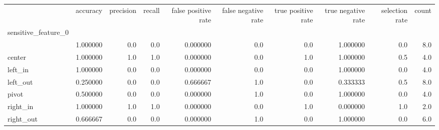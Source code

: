 \begin{tabular}{lrrrrrrrrr}
\toprule
{} &  accuracy &  precision &  recall &  false positive rate &  false negative rate &  true positive rate &  true negative rate &  selection rate &  count \\
sensitive\_feature\_0 &           &            &         &                      &                      &                     &                     &                 &        \\
\midrule
                    &  1.000000 &        0.0 &     0.0 &             0.000000 &                  0.0 &                 0.0 &            1.000000 &             0.0 &    8.0 \\
center              &  1.000000 &        1.0 &     1.0 &             0.000000 &                  0.0 &                 1.0 &            1.000000 &             0.5 &    4.0 \\
left\_in             &  1.000000 &        0.0 &     0.0 &             0.000000 &                  0.0 &                 0.0 &            1.000000 &             0.0 &    4.0 \\
left\_out            &  0.250000 &        0.0 &     0.0 &             0.666667 &                  1.0 &                 0.0 &            0.333333 &             0.5 &    8.0 \\
pivot               &  0.500000 &        0.0 &     0.0 &             0.000000 &                  1.0 &                 0.0 &            1.000000 &             0.0 &    4.0 \\
right\_in            &  1.000000 &        1.0 &     1.0 &             0.000000 &                  0.0 &                 1.0 &            0.000000 &             1.0 &    2.0 \\
right\_out           &  0.666667 &        0.0 &     0.0 &             0.000000 &                  1.0 &                 0.0 &            1.000000 &             0.0 &    6.0 \\
\bottomrule
\end{tabular}
